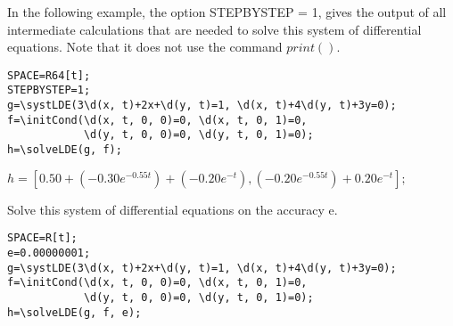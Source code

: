 In the following example, the option STEPBYSTEP = 1, gives the output of all intermediate calculations that are needed to solve this system of differential
equations. Note that it does not use the command $ print()$.

\begin{verbatim}
SPACE=R64[t];
STEPBYSTEP=1;
g=\systLDE(3\d(x, t)+2x+\d(y, t)=1, \d(x, t)+4\d(y, t)+3y=0);
f=\initCond(\d(x, t, 0, 0)=0, \d(x, t, 0, 1)=0, 
            \d(y, t, 0, 0)=0, \d(y, t, 0, 1)=0);
h=\solveLDE(g, f);  
\end{verbatim}

{$h = [0. 50+(-0. 30 e^{-0. 55t})+(-0. 20 e^{-t}), (-0. 20 e^{-0. 55t})+0. 20 e^{-t}];$}

Solve this system of differential equations on the accuracy e.

\begin{verbatim}
SPACE=R[t];
e=0.00000001;
g=\systLDE(3\d(x, t)+2x+\d(y, t)=1, \d(x, t)+4\d(y, t)+3y=0);
f=\initCond(\d(x, t, 0, 0)=0, \d(x, t, 0, 1)=0, 
            \d(y, t, 0, 0)=0, \d(y, t, 0, 1)=0);
h=\solveLDE(g, f, e);  
\end{verbatim}

